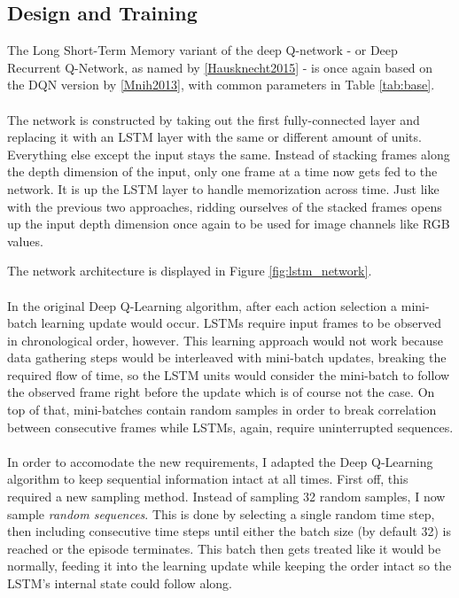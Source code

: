 \subsection{Design and Training}
\label{sub:lstm_design_and_training}
The Long Short-Term Memory variant
of the deep Q-network
- or Deep Recurrent Q-Network,
as named by \ref{Hausknecht2015} -
is once again based on the DQN version
by \ref{Mnih2013},
with common parameters in Table \ref{tab:base}.

\paragraph{}
The network is constructed by taking out
the first fully-connected layer
and replacing it with an LSTM layer
with the same or different amount of units.
Everything else except the input stays the same.
Instead of stacking frames along the depth dimension of the input,
only one frame at a time now gets fed to the network.
It is up the LSTM layer to handle memorization across time.
Just like with the previous two approaches,
ridding ourselves of the stacked frames opens up the input depth dimension
once again
to be used for image channels like RGB values.

The network architecture is displayed in Figure \ref{fig:lstm_network}.

\paragraph{}
In the original Deep Q-Learning algorithm,
after each action selection
a mini-batch learning update would occur.
LSTMs require input frames to be observed in chronological order, however.
This learning approach would not work
because data gathering steps would be interleaved with mini-batch updates,
breaking the required flow of time,
so the LSTM units
would consider the mini-batch to follow the observed frame right before the update
which is of course not the case.
On top of that, mini-batches contain random samples
in order to break correlation
between consecutive frames
while LSTMs, again, require uninterrupted sequences.

\paragraph{}
In order to accomodate the new requirements,
I adapted the Deep Q-Learning algorithm
to keep sequential information intact at all times.
First off,
this required a new sampling method.
Instead of sampling 32 random samples,
I now sample \textit{random sequences}.
This is done by selecting a single random time step,
then including consecutive time steps
until either the batch size (by default 32)
is reached or the episode terminates.
This batch then gets treated like it would be normally,
feeding it into the learning update while keeping the order intact
so the LSTM's internal state could follow along.

